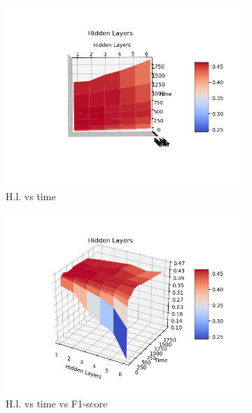 \begin{figure}
     \centering
     \begin{subfigure}[b]{0.3\textwidth}
         \centering
         \includegraphics[width=\textwidth]{pictures/hl_time.png}
         \caption{H.l. vs time}
         \label{fig:hl_time}
     \end{subfigure}
     \hfill
     \begin{subfigure}[b]{0.3\textwidth}
         \centering
         \includegraphics[width=\textwidth]{pictures/hl_time_fscore.png}
         \caption{H.l. vs time vs F1-score}
         \label{fig:hl_time_fscore_small}
     \end{subfigure}
     \hfill
     \begin{subfigure}[b]{0.3\textwidth}

\end{subfigure}
\end{figure}
